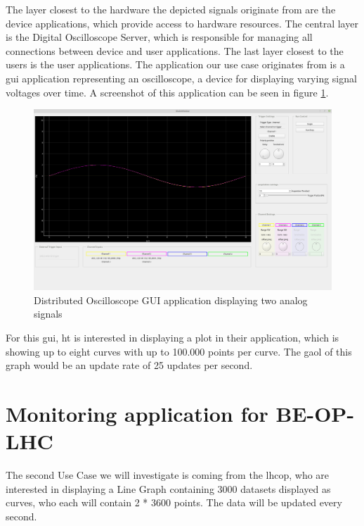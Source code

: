 The layer closest to the hardware the depicted signals originate from are the
device applications, which provide access to hardware resources. The central
layer is the Digital Oscilloscope Server, which is responsible for managing all
connections between device and user applications. The last layer closest to the
users is the user applications. The application our use case originates from
is a \gls{gui} application representing an oscilloscope, a device for displaying
varying signal voltages over time. A screenshot of this application can be seen
in figure \ref{fig:dogui}.
\cite{DistrOscDocs, BeCoHtSection}

\begin{figure}[h]
    \centering
    \includegraphics[width=15cm]{resources/img/DistributedOscilloscope}
    \caption{
        Distributed Oscilloscope GUI application displaying two analog signals
    }
    \label{fig:dogui}
\end{figure}

For this \gls{gui}, \gls{ht} is interested in displaying a plot in their
application, which is showing up to eight curves with up to 100.000 points per
curve. The gaol of this graph would be an update rate of 25 updates per second.


\section{Monitoring application for BE-OP-LHC}
\label{sec:usecases:becolhc}

The second Use Case we will investigate is coming from the \gls{lhcop}, who are
interested in displaying a Line Graph containing 3000 datasets displayed as
curves, who each will contain 2 * 3600 points. The data will be updated every
second.


